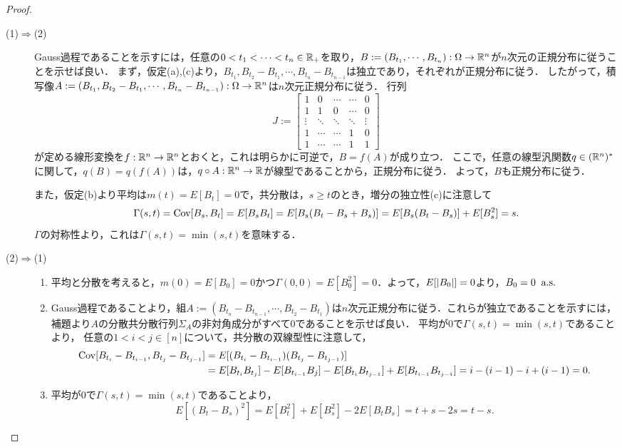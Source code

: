 \documentclass[uplatex,dvipdfmx]{jsarticle}
\begin{document}
\begin{proof}\mbox{}
    \begin{description}
        \item[(1)$\Rightarrow$(2)] Gauss過程であることを示すには，任意の$0<t_1<\cdots<t_n\in\mathbb{R}_+$を取り，$B:=(B_{t_1},\cdots,B_{t_n}):\Omega\to\mathbb{R}^n$が$n$次元の正規分布に従うことを示せば良い．
        まず，仮定(a),(c)より，$B_{t_1},B_{t_2}-B_{t_1},\cdots,B_{t_n}-B_{t_{n-1}}$は独立であり，それぞれが正規分布に従う．
        したがって，積写像$A:=(B_{t_1},B_{t_2}-B_{t_1},\cdots,B_{t_n}-B_{t_{n-1}}):\Omega\to\mathbb{R}^n$は$n$次元正規分布に従う．
        行列
        \[J:=\begin{bmatrix}1&0&\cdots&\cdots&0\\1&1&0&\cdots&0\\\vdots&\ddots&\ddots&\ddots&\vdots\\1&\cdots&\cdots&1&0\\1&\cdots&\cdots&1&1\end{bmatrix}\]
        が定める線形変換を$f:\mathbb{R}^n\to\mathbb{R}^n$とおくと，これは明らかに可逆で，$B=f(A)$が成り立つ．
        ここで，任意の線型汎関数$q\in(\mathbb{R}^n)^*$に関して，$q(B)=q(f(A))$は，$q\circ A:\mathbb{R}^n\to\mathbb{R}$が線型であることから，正規分布に従う．
        よって，$B$も正規分布に従う．

        また，仮定(b)より平均は$m(t)=E[B_t]=0$で，共分散は，$s\ge t$のとき，増分の独立性(c)に注意して
        \[\Gamma(s,t)=\mathrm{Cov}[B_s,B_t]=E[B_sB_t]=E[B_s(B_t-B_s+B_s)]=E[B_s(B_t-B_s)]+E[B_s^2]=s.\]
        $\Gamma$の対称性より，これは$\Gamma(s,t)=\min(s,t)$を意味する．
        \item[(2)$\Rightarrow$(1)] \mbox{}
        \begin{enumerate}[({B}1)]
            \item 平均と分散を考えると，$m(0)=E[B_0]=0$かつ$\Gamma(0,0)=E[B_0^2]=0$．よって，$E[\lvert B_0\rvert]=0$より，$B_0=0\;\;\mathrm{a.s.}$
            \item Gauss過程であることより，組$A:=(B_{t_n}-B_{t_{n-1}},\cdots,B_{t_2}-B_{t_1})$は$n$次元正規分布に従う．これらが独立であることを示すには，補題より$A$の分散共分散行列$\Sigma_A$の非対角成分がすべて$0$であることを示せば良い．
            平均が$0$で$\Gamma(s,t)=\min(s,t)$であることより，
            任意の$1<i< j\in[n]$について，共分散の双線型性に注意して，
            \begin{align*}
                \mathrm{Cov}[B_{t_i}-B_{t_{i-1}},B_{t_j}-B_{t_{j-1}}]&=E[(B_{t_i}-B_{t_{i-1}})(B_{t_j}-B_{t_{j-1}})]\\
                &=E[B_{t_i}B_{t_j}]-E[B_{t_{i-1}}B_j]-E[B_{t_i}B_{t_{j-1}}]+E[B_{t_{i-1}}B_{t_{j-1}}]=i-(i-1)-i+(i-1)=0.
            \end{align*}
            \item 平均が$0$で$\Gamma(s,t)=\min(s,t)$であることより，
            \[E[(B_t-B_s)^2]=E[B_t^2]+E[B_s^2]-2E[B_tB_s]=t+s-2s=t-s.\]
        \end{enumerate}
    \end{description}
\end{proof}
\end{document}
